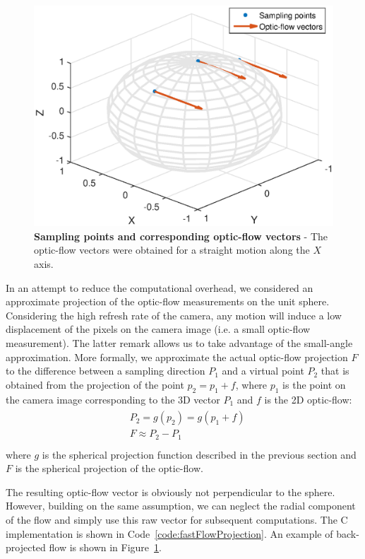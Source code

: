 \begin{figure}[t]
\centering
\includegraphics[width = 0.7\linewidth]{images/matlab/opticFlow}
\caption{\textbf{Sampling points and corresponding optic-flow vectors} - The optic-flow vectors were obtained for a straight motion along the $X$ axis.\label{fig:flowMapping}}
\end{figure}

In an attempt to reduce the computational overhead, we considered an approximate projection of the optic-flow measurements on the unit sphere. Considering the high refresh rate of the camera, any motion will induce a low displacement of the pixels on the camera image (i.e. a small optic-flow measurement). The latter remark allows us to take advantage of the small-angle approximation. More formally, we approximate the actual optic-flow projection $F$ to the difference between a sampling direction $P_1$ and a virtual point $P_2$ that is obtained from the projection of the point $p_2 = p_1 + f$, where $p_1$ is the point on the camera image corresponding to the 3D vector $P_1$ and $f$ is the 2D optic-flow:
\begin{align}
\begin{split}
{}&P_2 = g(p_2) = g(p_1 + f)\\
{}&F \approx P_2 - P_1\\
\end{split}
\end{align}
where $g$ is the spherical projection function described in the previous section and $F$ is the spherical projection of the optic-flow.

The resulting optic-flow vector is obviously not perpendicular to the sphere. However, building on the same assumption, we can neglect the radial component of the flow and simply use this raw vector for subsequent computations. The C implementation is shown in Code~\ref{code:fastFlowProjection}. An example of back-projected flow is shown in Figure~\ref{fig:flowMapping}.

